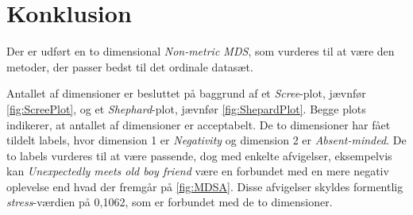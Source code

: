 \section*{Konklusion}
\label{Konklusion}
%
Der er udført en to dimensional \textit{Non-metric MDS}, som vurderes til at være den metoder, der passer bedst til det ordinale datasæt. 

Antallet af dimensioner er besluttet på baggrund af et \textit{Scree}-plot, jævnfør \autoref{fig:ScreePlot}, og et \textit{Shephard}-plot, jævnfør \autoref{fig:ShepardPlot}. Begge plots indikerer, at antallet af dimensioner er acceptabelt. De to dimensioner har fået tildelt labels, hvor dimension 1 er \textit{Negativity} og dimension 2 er \textit{Absent-minded}. De to labels vurderes til at være passende, dog med enkelte afvigelser, eksempelvis kan \textit{Unexpectedly meets old boy friend} være en forbundet med en mere negativ oplevelse end hvad der fremgår på \autoref{fig:MDSA}. Disse afvigelser skyldes formentlig \textit{stress}-værdien på 0,1062, som er forbundet med de to dimensioner.
